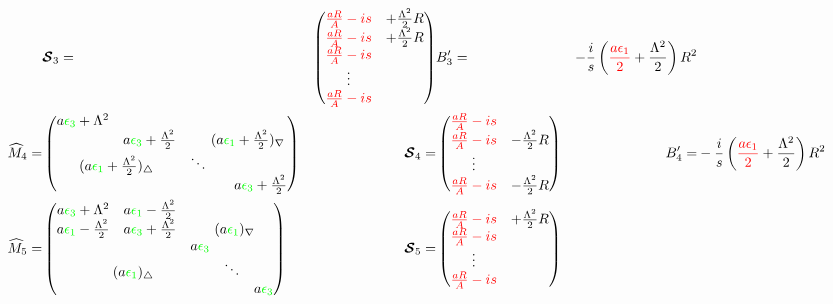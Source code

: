 \documentclass[aps,prd,onecolumn
,tightenlines,letterpaper,
notitlepage,11pt,linenumbers,
nofootinbib]{revtex4-1}
\begin{document}
\begin{align*}
&
\ve{\cS}_3 =&\begin{pmatrix}\red{\frac{aR}{A}-is}&+\frac{\Lambda^2}{2}R\\\red{\frac{aR}{A}-is}&+\frac{\Lambda^2}{2}R \\ \red{\frac{aR}{A}-is}&\\\vdots&\\
\red{\frac{aR}{A}-is}\end{pmatrix}
&
B'_3=&-\frac{i}{s}\left(\red{\frac{a\epsilon_1}{2}}+\frac{\Lambda^2}{2}\right)R^2
\\
\cM_4 =&
\begin{pmatrix}
a\green{\epsilon_3}+\Lambda^2 & & & \\ 
& a\green{\epsilon_3}+\frac{\Lambda^2}{2} & &\multicolumn{2}{l}{\!\!\!\!(a\green{\epsilon_1}+\frac{\Lambda^2}{2})_\nabla} \\
 \multicolumn{2}{c}{(a\green{\epsilon_1}+\frac{\Lambda^2}{2})_\triangle} & \ddots & \\
  & & & & a\green{\epsilon_3}+\frac{\Lambda^2}{2} \\
\end{pmatrix}
&
\ve{\cS}_4 =&\begin{pmatrix}\red{\frac{aR}{A}-is}&\\\red{\frac{aR}{A}-is}&-\frac{\Lambda^2}{2}R \\
\vdots&\\ \red{\frac{aR}{A}-is}&-\frac{\Lambda^2}{2}R\end{pmatrix}
&
B'_4=&-\frac{i}{s}\left(\red{\frac{a\epsilon_1}{2}}+\frac{\Lambda^2}{2}\right)R^2
\\
\cM_5 =&
\begin{pmatrix}
a\green{\epsilon_3}+\Lambda^2 & a\green{\epsilon_1}-\frac{\Lambda^2}{2} & & &\\ 
a\green{\epsilon_1}-\frac{\Lambda^2}{2} & a\green{\epsilon_3}+\frac{\Lambda^2}{2} & &\multicolumn{2}{l}{\!\!\!\!(a\green{\epsilon_1})_\nabla} \\
&& a\green{\epsilon_3} &&\\
 \multicolumn{3}{c}{(a\green{\epsilon_1})_\triangle} & \ddots & \\
  & & & & a\green{\epsilon_3} \\
\end{pmatrix}
&
\ve{\cS}_5 =&\begin{pmatrix}\red{\frac{aR}{A}-is}&+\frac{\Lambda^2}{2}R\\\red{\frac{aR}{A}-is}& \\
\vdots&\\ \red{\frac{aR}{A}-is}&\end{pmatrix}

\end{align*}
\end{document}

